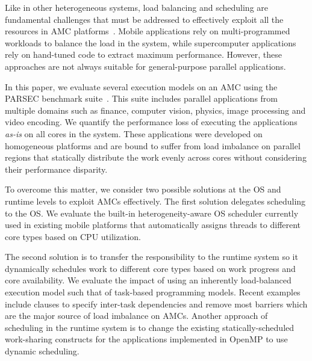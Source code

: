 Like in other heterogeneous systems, load balancing and scheduling are fundamental challenges that must be addressed to effectively exploit all the resources in AMC platforms~\cite{Suleman:APLOS2009,Fedorova2009,Greenhalgh2011,Joao:ASPLOS2012,Joao:ISCA2013,ARM4HPC_SC13}. 
Mobile applications rely on multi-programmed workloads to balance the load in the system, while supercomputer applications rely on hand-tuned code to extract maximum performance. 
However, these approaches are not always suitable for general-purpose parallel applications.

In this paper, we evaluate several execution models on an AMC using the PARSEC benchmark suite~\cite{PARSEC3}. 
This suite includes parallel applications from multiple domains such as finance, computer vision, physics, image processing and video encoding. 
We quantify the performance loss of executing the applications \textit{as-is} on all cores in the system. 
These applications were developed on homogeneous platforms and are bound to suffer from load imbalance on parallel regions that statically distribute the work evenly across cores without considering their performance disparity.

To overcome this matter, we consider two possible solutions at the OS and runtime levels to exploit AMCs effectively.
The first solution delegates scheduling to the OS.
We evaluate the built-in heterogeneity-aware OS scheduler currently used in existing mobile platforms that automatically assigns threads to different core types based on CPU utilization. 

The second solution is to transfer the responsibility to the runtime system so it dynamically schedules work to different core types based on work progress and core availability. 
We evaluate the impact of using an inherently load-balanced execution model such that of task-based programming models. 
Recent examples~\cite{Ayguade:TPDS2009, OpenMP4.0:Manual2013, OmpSs_PPL11, vectorMulticore, Bauer.2012.SC,rollback,Vandierendonck:PACT2011, Vandierendonck:Hyperq,spawn} include clauses to specify inter-task dependencies and remove most barriers which are the major source of load imbalance on AMCs.
Another approach of scheduling in the runtime system is to change the existing statically-scheduled work-sharing constructs for the applications implemented in OpenMP to use dynamic scheduling. 


